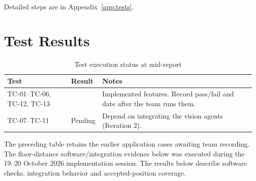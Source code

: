 Detailed steps are in Appendix~\ref{app:tests}.

\section{Test Results}
\begin{table}[H]
\centering
\caption{Test execution status at mid-report}
\begin{tabular}{P{0.12\textwidth}P{0.18\textwidth}P{0.5\textwidth}}
\toprule
Test & Result & Notes\\
\midrule
TC-01--TC-06, TC-12, TC-13 &  & Implemented features. Record pass/fail and date after the team runs them.\\
TC-07--TC-11 & Pending & Depend on integrating the vision agents (Iteration 2).\\
\bottomrule
\end{tabular}
\end{table}
The preceding table retains the earlier application cases awaiting team recording. The floor-distance software/integration evidence below was executed during the 19--20 October 2026 implementation session. The results below describe software checks, integration behavior and accepted-position coverage.

